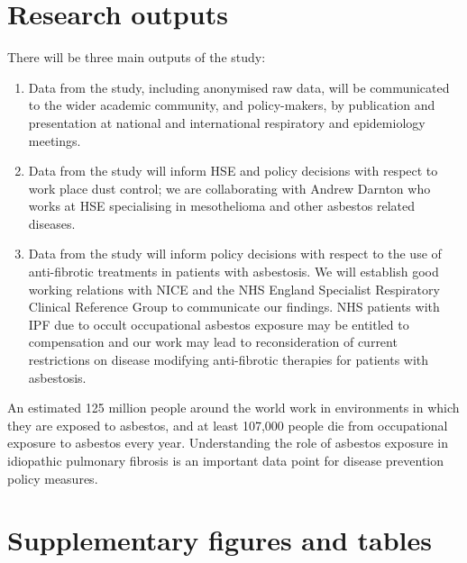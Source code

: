 \documentclass[a4paper,10pt]{article}
\begin{document}
\begin{appendices}

\section{Research outputs}

There will be three main outputs of the study:

\begin{enumerate}
 \item Data from the study, including anonymised raw data, will be communicated to the wider academic community,
and policy-makers, by publication and presentation at national and international respiratory and epidemiology
meetings.
 \item Data from the study will inform HSE and policy decisions with respect to work place dust control; we are
collaborating with Andrew Darnton who works at HSE specialising in mesothelioma and other asbestos related
diseases.
 \item Data from the study will inform policy decisions with respect to the use of anti-fibrotic treatments in patients
with asbestosis. We will establish good working relations with NICE
and the NHS England Specialist Respiratory Clinical Reference Group to communicate our findings.
NHS patients with IPF due to occult occupational asbestos exposure may be entitled to compensation and our
work may lead to reconsideration of current restrictions on disease modifying anti-fibrotic therapies for patients
with asbestosis.
\end{enumerate}

An estimated 125 million people around the world work in environments in which they are exposed to asbestos,
and at least 107,000 people die from occupational exposure to asbestos every year\cite{Concha-Barrientos2004}. Understanding the role of
asbestos exposure in idiopathic pulmonary fibrosis is an important data point for disease prevention policy
measures.

\newpage

\section{Supplementary figures and tables}


\end{appendices}
\end{document}
